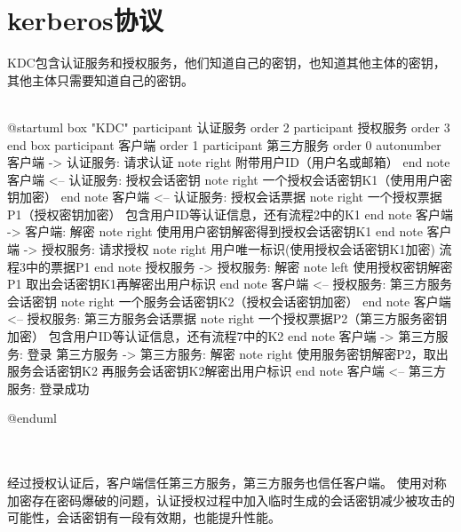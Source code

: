 \documentclass[a4paper]{scrartcl}
\begin{document}
\section{kerberos协议}
KDC包含认证服务和授权服务，他们知道自己的密钥，也知道其他主体的密钥，其他主体只需要知道自己的密钥。\\\\
\begin{plantuml}
    @startuml
    box "KDC"
    participant 认证服务 order 2
    participant 授权服务 order 3
    end box
    participant 客户端 order 1
    participant 第三方服务 order 0
    autonumber
    客户端 -> 认证服务: 请求认证
    note right
    附带用户ID（用户名或邮箱）
    end note
    客户端 <-- 认证服务: 授权会话密钥
    note right
    一个授权会话密钥K1（使用用户密钥加密）
    end note
    客户端 <-- 认证服务: 授权会话票据
    note right
    一个授权票据P1（授权密钥加密）
    包含用户ID等认证信息，还有流程2中的K1
    end note
    客户端 -> 客户端: 解密
    note right
    使用用户密钥解密得到授权会话密钥K1
    end note
    客户端 -> 授权服务: 请求授权
    note right
    用户唯一标识(使用授权会话密钥K1加密)
    流程3中的票据P1
    end note
    授权服务 -> 授权服务: 解密
    note left
    使用授权密钥解密P1
    取出会话密钥K1再解密出用户标识
    end note
    客户端 <-- 授权服务: 第三方服务会话密钥
    note right
    一个服务会话密钥K2（授权会话密钥加密）
    end note
    客户端 <-- 授权服务: 第三方服务会话票据
    note right
    一个授权票据P2（第三方服务密钥加密）
    包含用户ID等认证信息，还有流程7中的K2
    end note
    客户端 -> 第三方服务: 登录
    第三方服务 -> 第三方服务: 解密
    note right
    使用服务密钥解密P2，取出服务会话密钥K2
    再服务会话密钥K2解密出用户标识
    end note
    客户端 <-- 第三方服务: 登录成功
    
    @enduml
\end{plantuml}    
\\\\
经过授权认证后，客户端信任第三方服务，第三方服务也信任客户端。
使用对称加密存在密码爆破的问题，认证授权过程中加入临时生成的会话密钥减少被攻击的可能性，会话密钥有一段有效期，也能提升性能。
\clearpage
\end{document}
